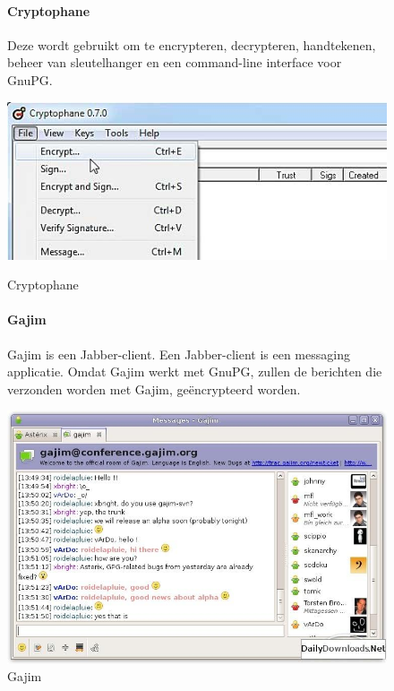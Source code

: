 \documentclass[12pt]{article}
\begin{document}
			
				\begin{figure}[!ht]
					\paragraph{Cryptophane}
						Deze wordt gebruikt om te encrypteren, decrypteren, handtekenen, beheer van sleutelhanger en een command-line interface voor GnuPG.\\
					\begin{center}
						\includegraphics[scale=0.6]{Pictures/cryptophane}
					\end{center}
					\caption{Cryptophane}
				
					\paragraph{Gajim}
						Gajim is een Jabber-client. Een Jabber-client is een messaging applicatie.
						Omdat Gajim werkt met GnuPG, zullen de berichten die verzonden worden met Gajim, ge\"encrypteerd worden.
					\begin{center}
						\includegraphics[scale=0.4]{Pictures/gajim}
					\end{center}
					\caption{Gajim}
				\end{figure}
				
\end{document}
